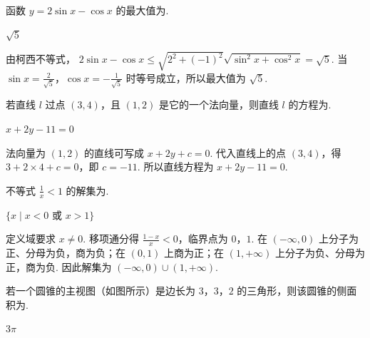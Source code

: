 \begin{problem}
函数 \( y = 2\sin x - \cos x \) 的最大值为\fillinblank{}.
\end{problem}

\begin{answer}
\(\sqrt{5}\)
\end{answer}

\begin{solution}
由柯西不等式，
\(2\sin x-\cos x\leqslant\sqrt{2^2+(-1)^2}\sqrt{\sin^2x+\cos^2x}=\sqrt5\). 当 \(\sin x=\frac{2}{\sqrt5}\)，\(\cos x=-\frac{1}{\sqrt5}\) 时等号成立，所以最大值为 \(\sqrt5\).
\end{solution}

\begin{problem}
若直线 \(l\) 过点 \( (3,4) \)，且 \( (1,2) \) 是它的一个法向量，则直线 \(l\) 的方程为\fillinblank{}.
\end{problem}

\begin{answer}
\(x+2y-11=0\)
\end{answer}

\begin{solution}
法向量为 \((1,2)\) 的直线可写成 \(x+2y+c=0\). 代入直线上的点 \((3,4)\)，得 \(3+2\times4+c=0\)，即 \(c=-11\). 所以直线方程为 \(x+2y-11=0\).
\end{solution}

\begin{problem}
不等式 \(\frac{1}{x} < 1\) 的解集为\fillinblank{}.
\end{problem}

\begin{answer}
\(\{x\mid x<0\text{ 或 }x>1\}\)
\end{answer}

\begin{solution}
定义域要求 \(x\neq0\). 移项通分得 \(\frac{1-x}{x}<0\)，临界点为 \(0\)，\(1\). 在 \((-\infty,0)\) 上分子为正、分母为负，商为负；在 \((0,1)\) 上商为正；在 \((1,+\infty)\) 上分子为负、分母为正，商为负. 因此解集为 \(\left(-\infty,0\right)\cup\left(1,+\infty\right)\).
\end{solution}

\begin{problem}
若一个圆锥的主视图（如图所示）是边长为 \(3\)，\(3\)，\(2\) 的三角形，则该圆锥的侧面积为\fillinblank{}.
\end{problem}

\begin{answer}
\(3\pi\)
\end{answer}

